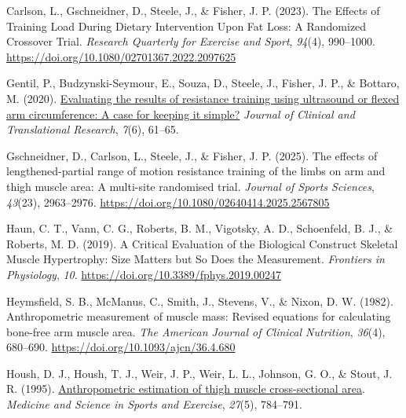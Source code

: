 \documentclass[
]{article}
\newlength{\cslhangindent}
\newenvironment{CSLReferences}[2] %
 {\begin{list}{}{%
  \setlength{\itemindent}{0pt}
  \setlength{\leftmargin}{0pt}
  \setlength{\parsep}{0pt}
  \ifodd #1
   \setlength{\leftmargin}{\cslhangindent}
   \setlength{\itemindent}{-1\cslhangindent}
  \fi
  \setlength{\itemsep}{#2\baselineskip}}}
 {\end{list}}
\begin{document}
\label{refs}
\begin{CSLReferences}{1}{0}
Carlson, L., Gschneidner, D., Steele, J., \& Fisher, J. P. (2023). The
{Effects} of {Training Load During Dietary Intervention Upon Fat Loss}:
{A Randomized Crossover Trial}. \emph{Research Quarterly for Exercise
and Sport}, \emph{94}(4), 990--1000.
\url{https://doi.org/10.1080/02701367.2022.2097625}

Gentil, P., Budzynski-Seymour, E., Souza, D., Steele, J., Fisher, J. P.,
\& Bottaro, M. (2020).
\href{https://www.ncbi.nlm.nih.gov/pmc/articles/PMC7787222}{Evaluating
the results of resistance training using ultrasound or flexed arm
circumference: {A} case for keeping it simple?} \emph{Journal of
Clinical and Translational Research}, \emph{7}(6), 61--65.

Gschneidner, D., Carlson, L., Steele, J., \& Fisher, J. P. (2025). The
effects of lengthened-partial range of motion resistance training of the
limbs on arm and thigh muscle area: {A} multi-site randomised trial.
\emph{Journal of Sports Sciences}, \emph{43}(23), 2963--2976.
\url{https://doi.org/10.1080/02640414.2025.2567805}

Haun, C. T., Vann, C. G., Roberts, B. M., Vigotsky, A. D., Schoenfeld,
B. J., \& Roberts, M. D. (2019). A {Critical Evaluation} of the
{Biological Construct Skeletal Muscle Hypertrophy}: {Size Matters} but
{So Does} the {Measurement}. \emph{Frontiers in Physiology}, \emph{10}.
\url{https://doi.org/10.3389/fphys.2019.00247}

Heymsfield, S. B., McManus, C., Smith, J., Stevens, V., \& Nixon, D. W.
(1982). Anthropometric measurement of muscle mass: Revised equations for
calculating bone-free arm muscle area. \emph{The American Journal of
Clinical Nutrition}, \emph{36}(4), 680--690.
\url{https://doi.org/10.1093/ajcn/36.4.680}

Housh, D. J., Housh, T. J., Weir, J. P., Weir, L. L., Johnson, G. O., \&
Stout, J. R. (1995).
\href{https://www.ncbi.nlm.nih.gov/pubmed/7674885}{Anthropometric
estimation of thigh muscle cross-sectional area}. \emph{Medicine and
Science in Sports and Exercise}, \emph{27}(5), 784--791.


\end{CSLReferences}
\end{document}
